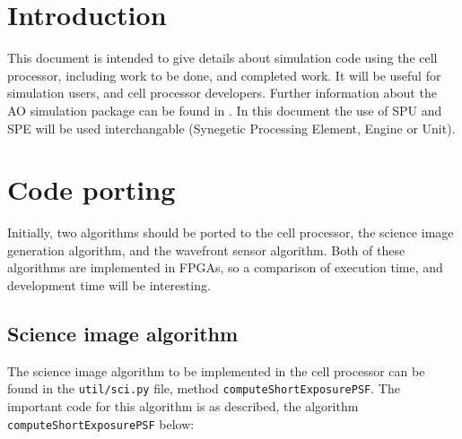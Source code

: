 \documentclass{article}
\begin{document}

\renewcommand{\esotitle}{The cell processor for AO simulation}
\renewcommand{\esodocno}{AOSIM-CEL-UoD-001}

\section{Introduction}
This document is intended to give details about simulation code using
the cell processor, including work to be done, and completed work.  It
will be useful for simulation users, and cell processor developers.
Further information about the AO simulation package can be found in
\citet{overview}.  In this document the use of SPU and SPE will be
used interchangable (Synegetic Processing Element, Engine or Unit).

\section{Code porting}
Initially, two algorithms should be ported to the cell processor, the
science image generation algorithm, and the wavefront sensor
algorithm.  Both of these algorithms are implemented in FPGAs, so a
comparison of execution time, and development time will be
interesting.

\subsection{Science image algorithm}
The science image algorithm to be implemented in the cell processor
can be found in the \texttt{util/sci.py} file, method
\texttt{computeShortExposurePSF}.  The important code for this
algorithm is as described, the algorithm
\texttt{computeShortExposurePSF} below:
\end{document}
